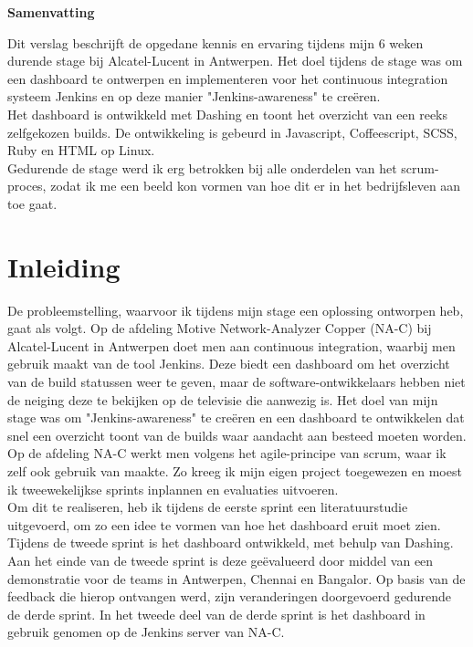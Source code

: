 \documentclass[10pt,a4paper]{article}
\begin{document}
\begin{center}
\textbf{Samenvatting}\\
\end{center}
Dit verslag beschrijft de opgedane kennis en ervaring tijdens mijn 6 weken durende stage bij Alcatel-Lucent in Antwerpen. Het doel tijdens de stage was om een dashboard te ontwerpen en implementeren voor het continuous integration systeem Jenkins en op deze manier "Jenkins-awareness" te cre\"eren.\\
Het dashboard is ontwikkeld met Dashing en toont het overzicht van een reeks zelfgekozen builds. De ontwikkeling is gebeurd in Javascript, Coffeescript, SCSS, Ruby en HTML op Linux.\\
Gedurende de stage werd ik erg betrokken bij alle onderdelen van het scrum-proces, zodat ik me een beeld kon vormen van hoe dit er in het bedrijfsleven aan toe gaat.

\tableofcontents
\clearpage

\section{Inleiding}
De probleemstelling, waarvoor ik tijdens mijn stage een oplossing ontworpen heb, gaat als volgt. Op de afdeling Motive Network-Analyzer Copper (NA-C) bij Alcatel-Lucent in Antwerpen doet men aan continuous integration, waarbij men gebruik maakt van de tool Jenkins. Deze biedt een dashboard om het overzicht van de build statussen weer te geven, maar de software-ontwikkelaars hebben niet de neiging deze te bekijken op de televisie die aanwezig is. Het doel van mijn stage was om "Jenkins-awareness" te cre\"eren en een dashboard te ontwikkelen dat snel een overzicht toont van de builds waar aandacht aan besteed moeten worden. Op de afdeling NA-C werkt men volgens het agile-principe van scrum, waar ik zelf ook gebruik van maakte. Zo kreeg ik mijn eigen project toegewezen en moest ik tweewekelijkse sprints inplannen en evaluaties uitvoeren.\\

Om dit te realiseren, heb ik tijdens de eerste sprint een literatuurstudie uitgevoerd, om zo een idee te vormen van hoe het dashboard eruit moet zien. Tijdens de tweede sprint is het dashboard ontwikkeld, met behulp van Dashing. Aan het einde van de tweede sprint is deze ge\"evalueerd door middel van een demonstratie voor de teams in Antwerpen, Chennai en Bangalor. Op basis van de feedback die hierop ontvangen werd, zijn veranderingen doorgevoerd gedurende de derde sprint. In het tweede deel van de derde sprint is het dashboard in gebruik genomen op de Jenkins server van NA-C.\\
\end{document}
